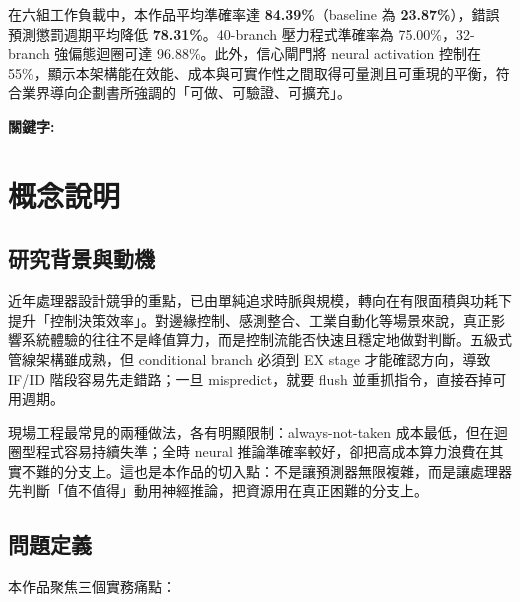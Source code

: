 \documentclass[12pt,a4paper]{article}
\begin{document}
	在六組工作負載中，本作品平均準確率達 \textbf{84.39\%}（baseline 為 \textbf{23.87\%}），錯誤預測懲罰週期平均降低 \textbf{78.31\%}。40-branch 壓力程式準確率為 75.00\%，32-branch 強偏態迴圈可達 96.88\%。此外，信心閘門將 neural activation 控制在 55\%，顯示本架構能在效能、成本與可實作性之間取得可量測且可重現的平衡，符合業界導向企劃書所強調的「可做、可驗證、可擴充」。

	\bigskip
	\noindent\textbf{關鍵字:}\ \ProposalKeywords

	\bigskip
	\section{概念說明}
	\label{sec:concept}

	\subsection{研究背景與動機}
	\label{sec:background}

	近年處理器設計競爭的重點，已由單純追求時脈與規模，轉向在有限面積與功耗下提升「控制決策效率」。對邊緣控制、感測整合、工業自動化等場景來說，真正影響系統體驗的往往不是峰值算力，而是控制流能否快速且穩定地做對判斷。五級式管線架構雖成熟，但 conditional branch 必須到 EX stage 才能確認方向，導致 IF/ID 階段容易先走錯路；一旦 mispredict，就要 flush 並重抓指令，直接吞掉可用週期。

	現場工程最常見的兩種做法，各有明顯限制：always-not-taken 成本最低，但在迴圈型程式容易持續失準；全時 neural 推論準確率較好，卻把高成本算力浪費在其實不難的分支上。這也是本作品的切入點：不是讓預測器無限複雜，而是讓處理器先判斷「值不值得」動用神經推論，把資源用在真正困難的分支上。

	\subsection{問題定義}
	\label{sec:problem}

	本作品聚焦三個實務痛點：
\end{document}
